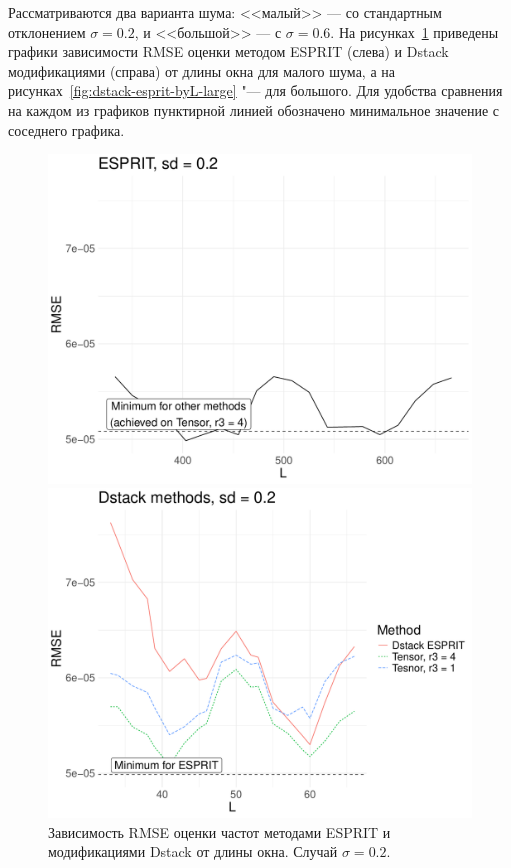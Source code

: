 \documentclass[specialist,
  substylefile=spbu_report.rtx,
subf,href,colorlinks=true, 12pt]{disser}
\theoremstyle{plain}
\theoremstyle{definition}
\theoremstyle{remark}
\begin{document}
Рассматриваются два варианта шума: <<малый>> --- со стандартным
отклонением \linebreak$\sigma=0.2$,
и <<большой>> --- с $\sigma = 0.6$.
На рисунках~\ref{fig:dstack-esprit-byL-small} приведены графики
зависимости RMSE оценки методом ESPRIT (слева) и Dstack модификациями
(справа) от длины окна для малого шума, а на
рисунках~\ref{fig:dstack-esprit-byL-large} "--- для большого.
Для удобства сравнения на каждом из графиков
пунктирной линией обозначено минимальное значение с соседнего графика.
\begin{figure}[!ht]
  \begin{minipage}{0.48\textwidth}
    \centering
    \includegraphics[width=\textwidth]{htlsd_byL_real_param_rmse_esprit_2.pdf}
  \end{minipage}
  \begin{minipage}{0.48\textwidth}
    \centering
    \includegraphics[width=\textwidth]{htlsd_byL_real_param_rmse_dstack_2.pdf}
  \end{minipage}
  \caption{Зависимость RMSE оценки частот методами ESPRIT и
  модификациями Dstack от длины окна. Случай $\sigma = 0.2$.}
  \label{fig:dstack-esprit-byL-small}
\end{figure}
\end{document}
